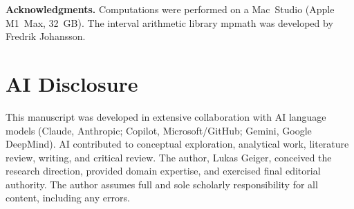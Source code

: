 \documentclass[12pt,a4paper]{article}
\theoremstyle{definition}
\theoremstyle{remark}
\begin{document}
\bigskip
\noindent\textbf{Acknowledgments.} Computations were performed on a
Mac~Studio (Apple M1~Max, 32~GB). The interval arithmetic library mpmath
was developed by Fredrik Johansson.


\section*{AI Disclosure}

This manuscript was developed in extensive collaboration with AI language
models (Claude, Anthropic; Copilot, Microsoft/GitHub; Gemini, Google
DeepMind). AI contributed to conceptual exploration, analytical work,
literature review, writing, and critical review. The author, Lukas
Geiger, conceived the research direction, provided domain expertise, and
exercised final editorial authority. The author assumes full and sole
scholarly responsibility for all content, including any errors.




\end{document}

